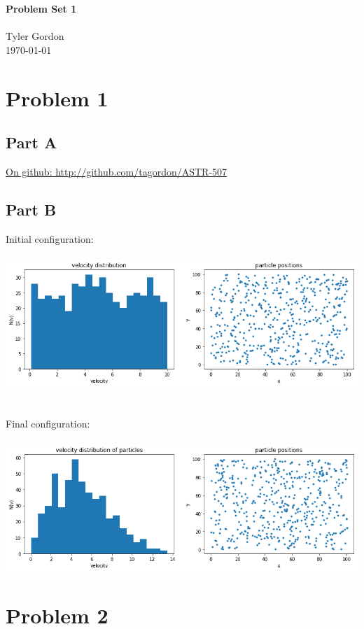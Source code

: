 \documentclass[a4paper, 11pt]{article}
\newcommand{\mytitle}{Problem Set 1}
\begin{document}
\noindent
\large\textbf{\mytitle} \\ \\ Tyler Gordon \\
\normalsize \today 
\ \ \hrulefill
\section*{Problem 1}
	\subsection*{Part A}
		\href{http://www.github.com/tagordon/ASTR-507}{On github: http://github.com/tagordon/ASTR-507}
	\subsection*{Part B}
		Initial configuration: 
		\ \\ \\
		\includegraphics[width=15cm]{before.png}
		\ \\ \\
		Final configuration:
		\ \\ \\
		\includegraphics[width=15cm]{after.png}
		\pagebreak
\section*{Problem 2}
\end{document}
